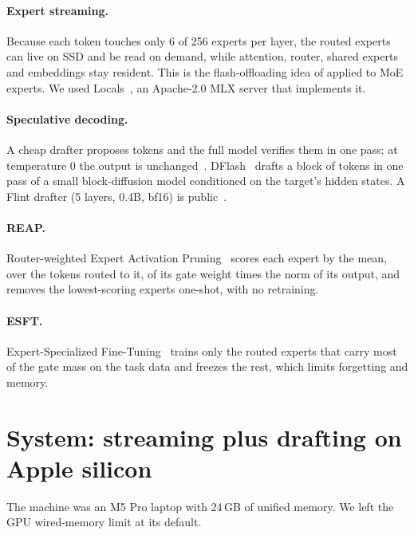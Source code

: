 \documentclass[11pt]{article}
\begin{document}
\paragraph{Expert streaming.} Because each token touches only 6 of 256 experts per layer, the routed experts can live on
SSD and be read on demand, while attention, router, shared experts and embeddings stay resident. This is the
flash-offloading idea of \citet{alizadeh2023flash} applied to MoE experts. We used Locals~\citep{locals}, an
Apache-2.0 MLX server that implements it.

\paragraph{Speculative decoding.} A cheap drafter proposes tokens and the full model verifies them in one pass; at
temperature 0 the output is unchanged~\citep{leviathan2022spec,chen2023specsampling}. DFlash~\citep{chen2026dflash}
drafts a block of tokens in one pass of a small block-diffusion model conditioned on the target's hidden states. A Flint
drafter (5 layers, 0.4B, bf16) is public~\citep{flintdflash2}.

\paragraph{REAP.} Router-weighted Expert Activation Pruning~\citep{lasby2025reap} scores each expert by the mean, over the
tokens routed to it, of its gate weight times the norm of its output, and removes the lowest-scoring experts
one-shot, with no retraining.

\paragraph{ESFT.} Expert-Specialized Fine-Tuning~\citep{wang2024esft} trains only the routed experts that carry most of the
gate mass on the task data and freezes the rest, which limits forgetting and memory.

\section{System: streaming plus drafting on Apple silicon}
\label{sec:system}

The machine was an M5 Pro laptop with 24\,GB of unified memory. We left the GPU wired-memory limit at its default.
\end{document}

